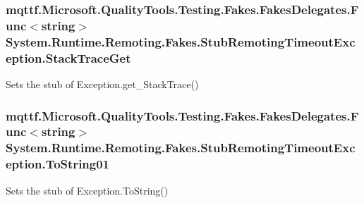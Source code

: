 \hypertarget{class_system_1_1_runtime_1_1_remoting_1_1_fakes_1_1_stub_remoting_timeout_exception_a164627099ebe44bdc835563b0f480c12}{
\subsubsection[{Stack\-Trace\-Get}]{\setlength{\rightskip}{0pt plus 5cm}mqttf.\-Microsoft.\-Quality\-Tools.\-Testing.\-Fakes.\-Fakes\-Delegates.\-Func$<$string$>$ System.\-Runtime.\-Remoting.\-Fakes.\-Stub\-Remoting\-Timeout\-Exception.\-Stack\-Trace\-Get}}\label{class_system_1_1_runtime_1_1_remoting_1_1_fakes_1_1_stub_remoting_timeout_exception_a164627099ebe44bdc835563b0f480c12}


Sets the stub of Exception.\-get\-\_\-\-Stack\-Trace()

\hypertarget{class_system_1_1_runtime_1_1_remoting_1_1_fakes_1_1_stub_remoting_timeout_exception_a8a8f4c39780d989c5f56eae5f7937659}{
\subsubsection[{To\-String01}]{\setlength{\rightskip}{0pt plus 5cm}mqttf.\-Microsoft.\-Quality\-Tools.\-Testing.\-Fakes.\-Fakes\-Delegates.\-Func$<$string$>$ System.\-Runtime.\-Remoting.\-Fakes.\-Stub\-Remoting\-Timeout\-Exception.\-To\-String01}}\label{class_system_1_1_runtime_1_1_remoting_1_1_fakes_1_1_stub_remoting_timeout_exception_a8a8f4c39780d989c5f56eae5f7937659}


Sets the stub of Exception.\-To\-String()



